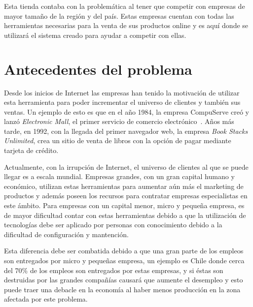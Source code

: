 Esta tienda contaba con la problemática al tener que competir con empresas de mayor 
tamaño de la región y del país. Estas empresas cuentan con todas las herramientas
necesarias para la venta de sus productos online y es aquí donde se utilizará 
el sistema creado para ayudar a competir con ellas. 

\section{Antecedentes del problema}

Desde los inicios de Internet las empresas han tenido la motivación de utilizar
esta herramienta para poder incrementar el universo de clientes y también sus
ventas.
Un ejemplo de esto es que en el año 1984, la empresa CompuServe creó y lanzó
\emph{Electronic Mall}, el primer servicio de comercio electrónico~\cite{Def:1}.
Años más tarde, en 1992, con la llegada del primer navegador web, la empresa
\emph{Book Stacks Unlimited}, crea un sitio de venta de libros con la opción de
pagar mediante tarjeta de crédito.

Actualmente, con la irrupción de Internet, el universo de clientes al que se
puede llegar es a escala mundial.
Empresas grandes, con un gran capital humano y económico, utilizan estas
herramientas para aumentar aún más el marketing de productos y además poseen los
recursos para contratar empresas especialistas en este ámbito.
Para empresas con un capital menor, micro y pequeña empresa, es de mayor
dificultad contar con estas herramientas debido a que la utilización de 
tecnologías debe ser aplicado por personas con conocimiento debido a la dificultad
de configuración y mantención.

Esta diferencia debe ser combatida debido a que una gran parte de los empleos
son entregados por micro y pequeñas empresa, un ejemplo es Chile donde cerca del
70\% de los empleos son entregados por estas empresas, y si éstas son destruidas
por las grandes compañías causará que aumente el desempleo y esto puede traer una
debacle en la economía al haber menos producción en la zona afectada por este
problema.


